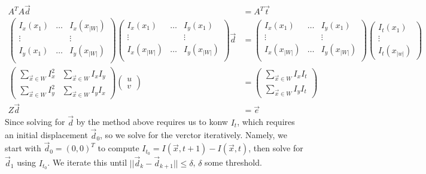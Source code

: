 \begin{align}  \label{eq:klt}
  A^TA\vec d &= A^T \vec t\\
  \begin{pmatrix}
    I_x(x_1) & \hdots & I_x(x_{|W|}) \\
   \vdots &  & \vdots \\
  I_y(x_1) & \hdots & I_y(x_{|W|}) \\
  \end{pmatrix}
  \begin{pmatrix}
    I_x(x_1) & \hdots &   I_y(x_1)  \\
   \vdots &  & \vdots \\
I_x(x_{|W|})& \hdots & I_y(x_{|W|}) \\
  \end{pmatrix}
\vec d  &= 
  \begin{pmatrix}
    I_x(x_1) & \hdots &   I_y(x_1)  \\
   \vdots &  & \vdots \\
I_x(x_{|W|})& \hdots & I_y(x_{|W|}) \\
  \end{pmatrix}
  \begin{pmatrix}
    I_t(x_1)\\ \vdots \\ I_t(x_{|w|})
  \end{pmatrix}\\
\begin{pmatrix}
\sum_{\vec x\in W}  I_x^2 &\sum_{\vec x\in W} I_xI_y\\ \sum_{\vec x\in
  W} I_y^2 &\sum_{\vec x\in W} I_yI_x
\end{pmatrix}
\begin{pmatrix}
  u \\ v
\end{pmatrix}
 &=
\begin{pmatrix}
 \sum_{\vec x\in W} I_xI_t\\ \sum_{\vec x\in W}I_yI_t
\end{pmatrix} \\
Z\vec d &= \vec e
\end{align}
Since solving for $\vec d$ by the method above requires us to konw
$I_t$, which requires an initial displacement $\vec d_0$, so we solve
for the verctor iteratively. Namely, we start with $\vec d_0
=(0,0)^T$ to compute $I_{t_0} = I(\vec x, t+1) - I(\vec x, t)$, then
solve for $\vec d_1$ using $I_{t_0}$. We iterate this until $||\vec
d_k - \vec d_{k+1}|| \le \delta$, $\delta$ some threshold.

